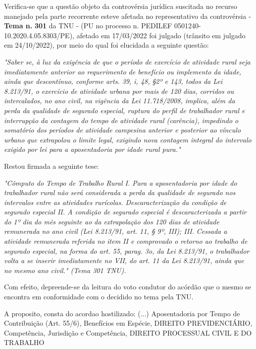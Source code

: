 \documentclass[12pt]{article}
\begin{document}
\justifying
\noindent Verifica-se que a questão objeto da controvérsia jurídica suscitada no recurso manejado pela parte recorrente esteve afetada no representativo da controvérsia - \textbf{Tema n. }\textbf{301} da TNU - (PU no processo n. PEDILEF 0501240-10.2020.4.05.8303/PE),  afetado em 17/03/2022 foi julgado (trânsito em julgado em 24/10/2022), por meio do qual foi elucidada a seguinte questão:

\noindent \textit{"Saber se, à luz da exigência de que o período de exercício de atividade rural seja imediatamente anterior ao requerimento de benefício ou implemento da idade, ainda que descontínuo, conforme arts. 39, i, 48, §2º e 143, todos da Lei 8.213/91, o exercício de atividade urbana por mais de 120 dias, corridos ou intercalados, no ano civil, na vigência da Lei 11.718/2008, implica, além da perda da qualidade de segurado especial, ruptura do perfil de trabalhador rural e interrupção da contagem do tempo de atividade rural (carência), impedindo o somatório dos períodos de atividade campesina anterior e posterior ao vínculo urbano que extrapolou o limite legal, exigindo nova contagem integral do intervalo exigido por lei para a aposentadoria por idade rural pura."}

\noindent Restou firmada a seguinte tese:

\noindent \textit{"Cômputo do Tempo de Trabalho Rural I. Para a aposentadoria por idade do trabalhador rural não será considerada a perda da qualidade de segurado nos intervalos entre as atividades rurícolas. Descaracterização da condição de segurado especial II. A condição de segurado especial é descaracterizada a partir do 1º dia do mês seguinte ao da extrapolação dos 120 dias de atividade remunerada no ano civil (Lei 8.213/91, art. 11, § 9º, III); III. Cessada a atividade remunerada referida no item II e comprovado o retorno ao trabalho de segurado especial, na forma do art. 55, parag. 3o, da Lei 8.213/91, o trabalhador volta a se inserir imediatamente no VII, do art. 11 da Lei 8.213/91, ainda que no mesmo ano civil." (Tema 301 TNU).}

\noindent Com efeito, depreende-se da leitura do voto condutor do acórdão que o mesmo se encontra em conformidade com o decidido no  tema pela TNU.

\noindent A proposito, consta do acordao hostilizado: (...) Aposentadoria por Tempo de Contribuição (Art. 55/6), Benefícios em Espécie, DIREITO PREVIDENCIÁRIO, Competência, Jurisdição e Competência, DIREITO PROCESSUAL CIVIL E DO TRABALHO
\end{document}
